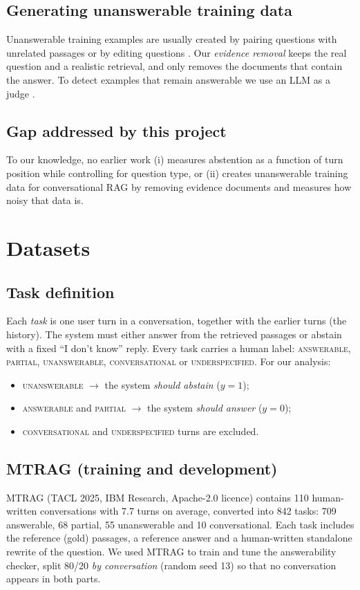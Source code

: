 \documentclass[11pt,a4paper]{report}
\begin{document}
\section{Generating unanswerable training data}
Unanswerable training examples are usually created by pairing questions with unrelated passages or by editing questions \cite{squad2}. Our \emph{evidence removal} keeps the real question and a realistic retrieval, and only removes the documents that contain the answer. To detect examples that remain answerable we use an LLM as a judge \cite{llmjudge}.

\section{Gap addressed by this project}
To our knowledge, no earlier work (i) measures abstention as a function of turn position while controlling for question type, or (ii) creates unanswerable training data for conversational RAG by removing evidence documents and measures how noisy that data is.

\chapter{Datasets}

\section{Task definition}
Each \emph{task} is one user turn in a conversation, together with the earlier turns (the history). The system must either answer from the retrieved passages or abstain with a fixed ``I don't know'' reply. Every task carries a human label: \textsc{answerable}, \textsc{partial}, \textsc{unanswerable}, \textsc{conversational} or \textsc{underspecified}. For our analysis:
\begin{itemize}
\item \textsc{unanswerable} $\rightarrow$ the system \emph{should abstain} ($y=1$);
\item \textsc{answerable} and \textsc{partial} $\rightarrow$ the system \emph{should answer} ($y=0$);
\item \textsc{conversational} and \textsc{underspecified} turns are excluded.
\end{itemize}

\section{MTRAG (training and development)}
MTRAG \cite{mtrag} (TACL 2025, IBM Research, Apache-2.0 licence) contains 110 human-written conversations with 7.7 turns on average, converted into 842 tasks: 709 answerable, 68 partial, 55 unanswerable and 10 conversational. Each task includes the reference (gold) passages, a reference answer and a human-written standalone rewrite of the question. We used MTRAG to train and tune the answerability checker, split 80/20 \emph{by conversation} (random seed 13) so that no conversation appears in both parts.
\end{document}
